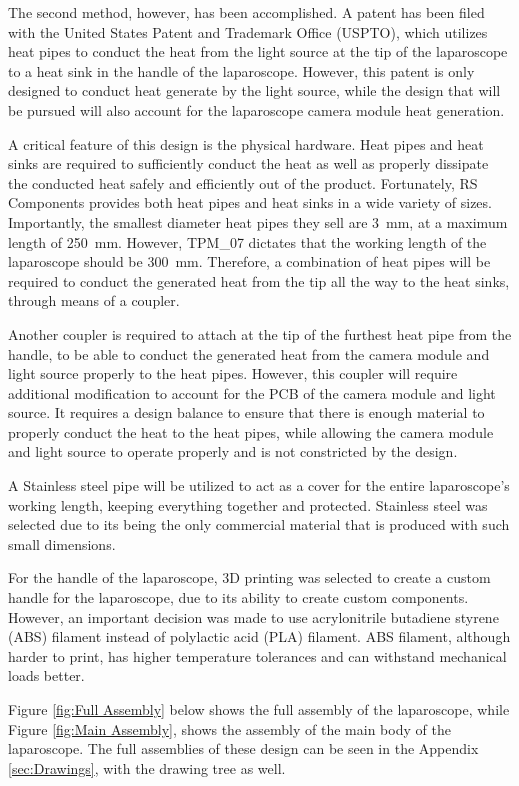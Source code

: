 The second method, however, has been accomplished. A patent has been filed with the United States Patent and Trademark Office (USPTO), which utilizes heat pipes to conduct the heat from the light source at the tip of the laparoscope to a heat sink in the handle of the laparoscope. \citep{USP-1} However, this patent is only designed to conduct heat generate by the light source, while the design that will be pursued will also account for the laparoscope camera module heat generation. 

A critical feature of this design is the physical hardware. Heat pipes and heat sinks are required to sufficiently conduct the heat as well as properly dissipate the conducted heat safely and efficiently out of the product. Fortunately, RS Components provides both heat pipes and heat sinks in a wide variety of sizes. Importantly, the smallest diameter heat pipes they sell are 3~mm, at a maximum length of 250~mm. However, TPM\_07 dictates that the working length of the laparoscope should be 300~mm. Therefore, a combination of heat pipes will be required to conduct the generated heat from the tip all the way to the heat sinks, through means of a coupler. \citep{RS}

Another coupler is required to attach at the tip of the furthest heat pipe from the handle, to be able to conduct the generated heat from the camera module and light source properly to the heat pipes. However, this coupler will require additional modification to account for the PCB of the camera module and light source. It requires a design balance to ensure that there is enough material to properly conduct the heat to the heat pipes, while allowing the camera module and light source to operate properly and is not constricted by the design. 

A Stainless steel pipe will be utilized to act as a cover for the entire laparoscope's working length, keeping everything together and protected. Stainless steel was selected due to its being the only commercial material that is produced with such small dimensions. 

For the handle of the laparoscope, 3D printing was selected to create a custom handle for the laparoscope, due to its ability to create custom components. However, an important decision was made to use acrylonitrile butadiene styrene (ABS) filament instead of polylactic acid (PLA) filament. ABS filament, although harder to print, has higher temperature tolerances and can withstand mechanical loads better. 

Figure \ref{fig:Full Assembly} below shows the full assembly of the laparoscope, while Figure \ref{fig:Main Assembly}, shows the assembly of the main body of the laparoscope. The full assemblies of these design can be seen in the Appendix \ref{sec:Drawings}, with the drawing tree as well.

